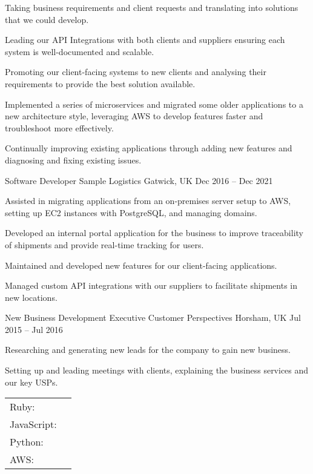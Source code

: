 \begin{cventries}
{\begin{cvitems}
		\item {Taking business requirements and client requests and translating into solutions that we could develop.}
		\item {Leading our API Integrations with both clients and suppliers ensuring each system is well-documented and scalable.}
		\item {Promoting our client-facing systems to new clients and analysing their requirements to provide the best solution available.}
		\item {Implemented a series of microservices and migrated some older applications to a new architecture style, leveraging AWS to develop features faster and troubleshoot more effectively.}
		\item {Continually improving existing applications through adding new features and diagnosing and fixing existing issues.}
		\end{cvitems}}
	\cventry
	{Software Developer}
	{Sample Logistics}
	{Gatwick, UK}
	{Dec 2016 – Dec 2021}
	{\begin{cvitems}
		\item {Assisted in migrating applications from an on-premises server setup to AWS, setting up EC2 instances with PostgreSQL, and managing domains.}
		\item {Developed an internal portal application for the business to improve traceability of shipments and provide real-time tracking for users.}
		\item {Maintained and developed new features for our client-facing applications.}
		\item {Managed custom API integrations with our suppliers to facilitate shipments in new locations.}
		\end{cvitems}}
	\cventry
	{New Business Development Executive}
	{Customer Perspectives}
	{Horsham, UK}
	{Jul 2015 – Jul 2016}
	{\begin{cvitems}
		\item {Researching and generating new leads for the company to gain new business.}
		\item {Setting up and leading meetings with clients, explaining the business services and our key USPs.}
		\end{cvitems}}
\end{cventries}
\begin{cventries}
	\cventry
	{}
	{\def\arraystretch{1.15}{\begin{tabular}{ l l }
		Ruby:  & {\skill{ Ruby on Rails, API Development, MVC, Web Scraping}} \\
		JavaScript:  & {\skill{ React, React Native, TypeScript, Node.js}} \\
		Python:  & {\skill{ Data Analysis, Database Scripts, Web Scraping, Migration Scripts, IoT (RaspberryPI)}} \\
		AWS:  & {\skill{ Elastic Beanstalk, Lambda, S3, Cognito, Amplify, RDS, DynamoDB}} \\
		\end{tabular}}}
	{}
	{}
	{}
\end{cventries}

